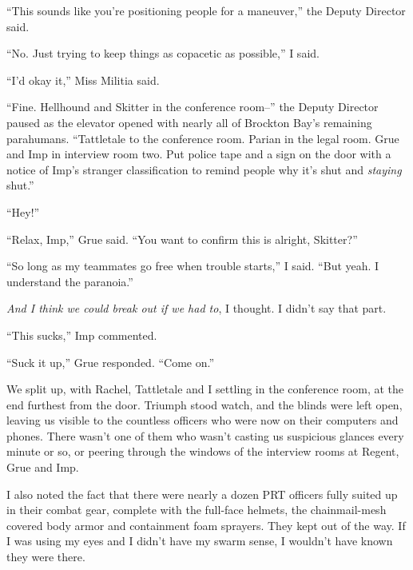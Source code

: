 ``This sounds like you're positioning people for a maneuver,'' the Deputy Director said.



``No.  Just trying to keep things as copacetic as possible,'' I said.



``I'd okay it,'' Miss Militia said.



``Fine.  Hellhound and Skitter in the conference room--'' the Deputy Director paused as the elevator opened with nearly all of Brockton Bay's remaining parahumans.  ``Tattletale to the conference room.  Parian in the legal room.  Grue and Imp in interview room two.  Put police tape and a sign on the door with a notice of Imp's stranger classification to remind people why it's shut and \emph{staying} shut.''



``Hey!''



``Relax, Imp,'' Grue said.  ``You want to confirm this is alright, Skitter?''



``So long as my teammates go free when trouble starts,'' I said.  ``But yeah.  I understand the paranoia.''



\emph{And I think we could break out if we had to}, I thought.  I didn't say that part.



``This sucks,'' Imp commented.



``Suck it up,'' Grue responded.  ``Come on.''



We split up, with Rachel, Tattletale and I settling in the conference room, at the end furthest from the door.  Triumph stood watch, and the blinds were left open, leaving us visible to the countless officers who were now on their computers and phones.  There wasn't one of them who wasn't casting us suspicious glances every minute or so, or peering through the windows of the interview rooms at Regent, Grue and Imp.



I also noted the fact that there were nearly a dozen PRT officers fully suited up in their combat gear, complete with the full-face helmets, the chainmail-mesh covered body armor and containment foam sprayers.  They kept out of the way.  If I was using my eyes and I didn't have my swarm sense, I wouldn't have known they were there.



